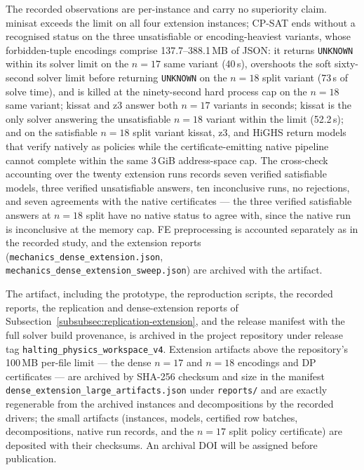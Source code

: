 \documentclass[11pt]{article}
\theoremstyle{plain}
\theoremstyle{definition}
\theoremstyle{remark}
\begin{document}
The recorded observations are per-instance and carry no superiority claim.
minisat exceeds the limit on all four extension instances; CP-SAT ends
without a recognised status on the three unsatisfiable or encoding-heaviest
variants, whose forbidden-tuple encodings comprise 137.7--388.1\,MB of JSON:
it returns \texttt{UNKNOWN} within its solver limit on the \(n{=}17\) same
variant (40\,s), overshoots the soft sixty-second solver limit before
returning \texttt{UNKNOWN} on the \(n{=}18\) split variant (73\,s of solve
time), and is killed at the ninety-second hard process cap on the
\(n{=}18\) same variant;
kissat and z3 answer both \(n{=}17\) variants in seconds; kissat is the
only solver answering the unsatisfiable \(n{=}18\) variant within the limit
(52.2\,s); and on the satisfiable \(n{=}18\) split variant kissat, z3, and
HiGHS return models that verify natively as policies while the
certificate-emitting native pipeline cannot complete within the same
3\,GiB address-space cap.  The cross-check accounting over the twenty
extension runs records seven verified satisfiable models, three verified
unsatisfiable answers, ten inconclusive runs, no rejections, and seven
agreements with the native certificates --- the three verified
satisfiable answers at \(n{=}18\) split have no native status to agree
with, since the native run is inconclusive at the memory cap.  FE
preprocessing is accounted separately as in the recorded study, and the
extension reports
(\texttt{mechanics\_dense\_extension.json}, \\
\texttt{mechanics\_dense\_extension\_sweep.json}) are archived with the
artifact.

The artifact, including the prototype, the reproduction scripts, the recorded
reports, the replication and dense-extension reports of
Subsection~\ref{subsubsec:replication-extension}, and the release manifest
with the full solver build provenance, is archived in the project repository
under release tag
\texttt{halting\_\allowbreak physics\_\allowbreak workspace\_\allowbreak v4}.  Extension
artifacts above the repository's 100\,MB per-file limit --- the dense
\(n{=}17\) and \(n{=}18\) encodings and DP certificates --- are archived
by SHA-256 checksum and size in the manifest
\texttt{dense\_\allowbreak extension\_\allowbreak large\_\allowbreak artifacts.json} under \texttt{reports/}
and are exactly
regenerable from the archived instances and decompositions by the recorded
drivers; the small artifacts (instances, models, certified row batches,
decompositions, native run records, and the \(n{=}17\) split policy
certificate) are deposited with their checksums.  An archival DOI will be
assigned before publication.
\end{document}

